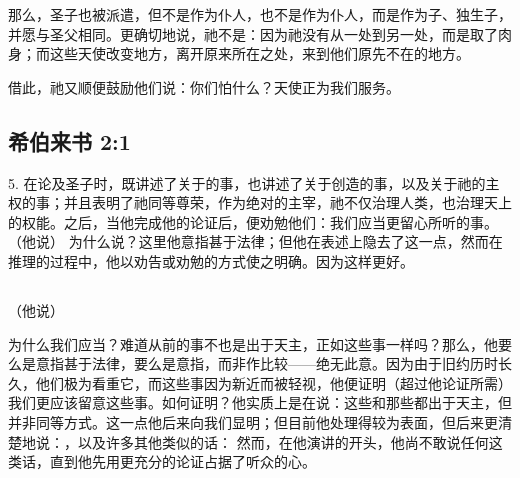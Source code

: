 那么，圣子也被派遣，但不是作为仆人，也不是作为仆人，而是作为子、独生子，并愿与圣父相同。更确切地说，祂不是：因为祂没有从一处到另一处，而是取了肉身；而这些天使改变地方，离开原来所在之处，来到他们原先不在的地方。\par

借此，祂又顺便鼓励他们说：你们怕什么？天使正为我们服务。\par


\subsection{希伯来书 2:1}

5. 在论及圣子时，既讲述了关于的事，也讲述了关于创造的事，以及关于祂的主权的事；并且表明了祂同等尊荣，作为绝对的主宰，祂不仅治理人类，也治理天上的权能。之后，当他完成他的论证后，便劝勉他们：我们应当更留心所听的事。 （他说） 为什么说？这里他意指甚于法律；但他在表述上隐去了这一点，然而在推理的过程中，他以劝告或劝勉的方式使之明确。因为这样更好。\par


\subsection{}

（他说）\par

为什么我们应当？难道从前的事不也是出于天主，正如这些事一样吗？那么，他要么是意指甚于法律，要么是意指，而非作比较——绝无此意。因为由于旧约历时长久，他们极为看重它，而这些事因为新近而被轻视，他便证明（超过他论证所需）我们更应该留意这些事。如何证明？他实质上是在说：这些和那些都出于天主，但并非同等方式。这一点他后来向我们显明；但目前他处理得较为表面，但后来更清楚地说：，以及许多其他类似的话： 然而，在他演讲的开头，他尚不敢说任何这类话，直到他先用更充分的论证占据了听众的心。\par

